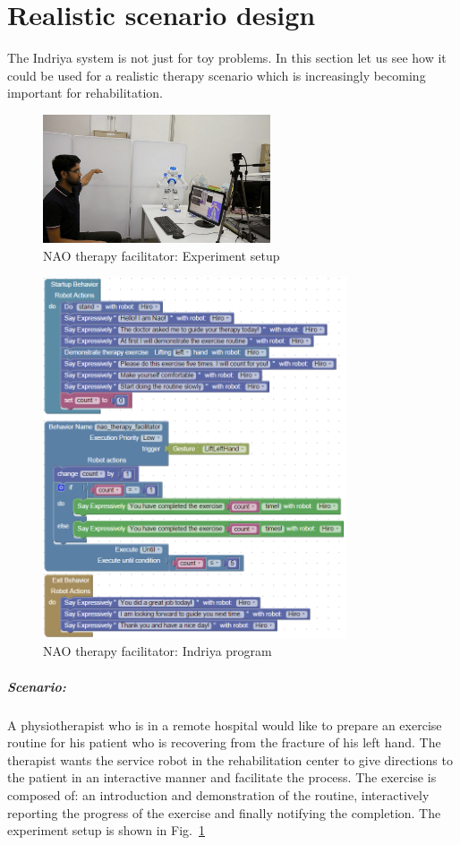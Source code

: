 \section{Realistic scenario design}
The Indriya system is not just for toy problems. In this section let us see how it could be used for a realistic therapy scenario which is increasingly becoming important for rehabilitation. 
\begin{figure}[H]
\centering
\includegraphics[width=0.6\textwidth]{../thesis/assets/scenario_therapy.png}
\caption[NAO therapy facilitator: Experiment setup]{NAO therapy facilitator: Experiment setup}
\label{fig:scenario2_setup}
\end{figure}
\begin{figure}[H]
\centering
\includegraphics[width=0.8\textwidth]{../thesis/assets/scenario2_new.png}
\caption[NAO therapy facilitator: Indriya program]{NAO therapy facilitator: Indriya program}
\label{fig:scenario2_program}
\end{figure}
\subparagraph{Scenario:}A physiotherapist who is in a remote hospital would like to prepare an exercise routine for his patient who is recovering from the fracture of his left hand. The therapist wants the service robot in the rehabilitation center to give directions to the patient in an interactive manner and facilitate the process. The exercise is composed of: an introduction and demonstration of the routine, interactively reporting the progress of the exercise and finally notifying the completion. The experiment setup is shown in Fig.~\ref{fig:scenario2_setup}

